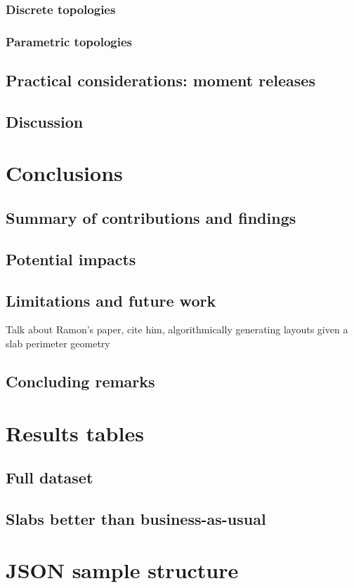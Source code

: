 \documentclass[10pt, letterpaper]{article} %
\begin{document}
    \subsubsection{Discrete topologies}

    \subsubsection{Parametric topologies}\label{sec:parametric-topologies}

    \subsection{Practical considerations: moment releases}\label{sec:moment-releases}

    \subsection{Discussion}

    \section{Conclusions}

    \subsection{Summary of contributions and findings}

    \subsection{Potential impacts}

    \subsection{Limitations and future work}

    Talk about Ramon's paper, cite him, algorithmically generating layouts given a slab perimeter geometry

    \subsection{Concluding remarks}

    \begin{appendices}
        \section{Results tables}
        \subsection{Full dataset}
        \subsection{Slabs better than business-as-usual}
        \section{JSON sample structure}
    \end{appendices}

    \printbibliography
\end{document}
